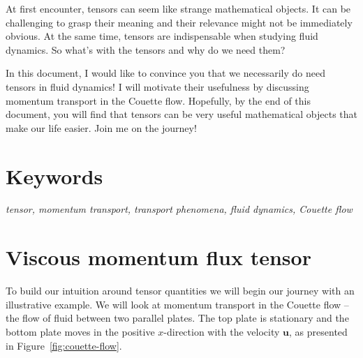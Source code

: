 \documentclass[10pt,twocolumn]{article}
\begin{document}
\small

At first encounter, tensors can seem like strange mathematical objects. It can be challenging to grasp their meaning and their relevance might not be immediately obvious. At the same time, tensors are indispensable when studying fluid dynamics. So what's with the tensors and why do we need them?

In this document, I would like to convince you that we necessarily do need tensors in fluid dynamics! I will motivate their usefulness by discussing momentum transport in the Couette flow. Hopefully, by the end of this document, you will find that tensors can be very useful mathematical objects that make our life easier. Join me on the journey!

\section*{Keywords}

\textit{tensor, momentum transport, transport phenomena, fluid dynamics, Couette flow}


\section*{Viscous momentum flux tensor}

To build our intuition around tensor quantities we will begin our journey with an illustrative example. We will look at momentum transport in the Couette flow -- the flow of fluid between two parallel plates. The top plate is stationary and the bottom plate moves in the positive $x$-direction with the velocity $\mathbf{u}$, as presented in Figure~\ref{fig:couette-flow}.
\end{document}
